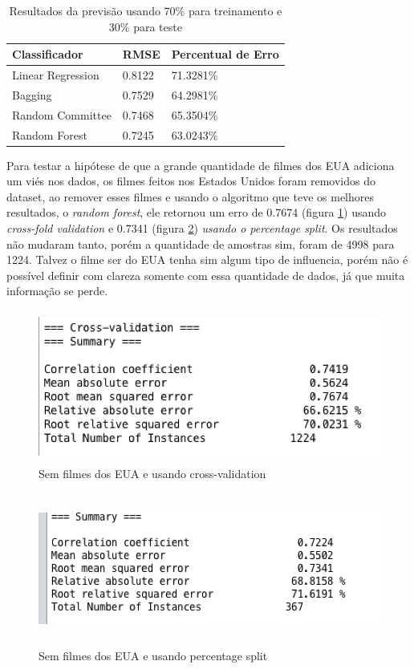 \begin{longtable}{|l|l|l|}
\caption{Resultados da previsão usando 70\% para treinamento e 30\% para teste}
\\\hline
\textbf{Classificador} & \textbf{RMSE} & \textbf{Percentual de Erro} \\ \hline
Linear Regression      & 0.8122        & 71.3281\%                   \\ \hline
Bagging                & 0.7529        & 64.2981\%                   \\ \hline
Random Committee       & 0.7468        & 65.3504\%                   \\ \hline
Random Forest          & 0.7245        & 63.0243\%                   \\ \hline
\end{longtable}



Para testar a hipótese de que a grande quantidade de filmes dos EUA adiciona um viés nos dados, os filmes feitos nos Estados Unidos foram removidos do dataset, ao remover esses filmes e usando o algoritmo que teve os melhores resultados, o \textit{random forest}, ele retornou um erro de 0.7674 (figura \ref{nousacv}) usando \textit{cross-fold validation} e 0.7341 (figura \ref{nousasplit}) \textit{usando o percentage split}. Os resultados não mudaram tanto, porém a quantidade de amostras sim, foram de 4998 para 1224. Talvez o filme ser do EUA tenha sim algum tipo de influencia, porém não é possível definir com clareza somente com essa quantidade de dados, já que muita informação se perde.

\begin{figure}[H]
\centering
\includegraphics[height=5cm]{imagens/sem_usa_cv.png}
\caption{Sem filmes dos EUA e usando cross-validation}
\label{nousacv}
\end{figure}

\begin{figure}[H]
\centering
\includegraphics[height=5cm]{imagens/sem_usa_split.png}
\caption{Sem filmes dos EUA e usando percentage split}
\label{nousasplit}
\end{figure}


